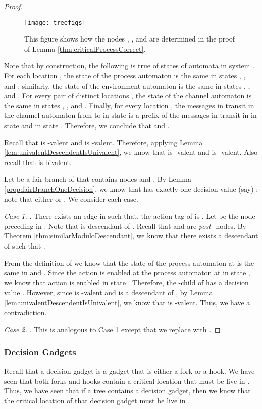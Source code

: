 \documentclass[11pt]{article}
\numberwithin{theorem}{section}
\begin{document}
\begin{proof}
\begin{figure}[hptb]
 \centering
\texttt{[image: treefigs]}
 \caption{This figure shows how the nodes , , and  are determined in the proof of Lemma \ref{thm:criticalProcessCorrect}.}
 \label{fig:extendPathsByFDEdges}
\end{figure}


Note that by construction, the following is true of states of automata in system . For each location , the state of the process automaton  is the same in states , , and ; similarly, the state of the environment automaton  is the same in states , , and . For every pair of distinct locations , the state of the channel automaton  is the same in states , , and . Finally, for every location , the messages in transit in the channel automaton  from  to  in state  is a prefix of the messages in transit in  in state  and in state . Therefore, we conclude that  and .

Recall that  is -valent and  is -valent. Therefore, applying Lemma \ref{lem:univalentDescendentIsUnivalent}, we know that  is -valent and   is -valent. Also recall that  is bivalent. 

Let  be a fair branch of  that contains nodes  and . 
By Lemma \ref{prop:fairBranchOneDecision}, we know that  has exactly one decision value (say) ; note that either  or . We consider each case.

\emph{Case 1.} . There exists an edge  in  such that, the action tag of  is . Let  be the node preceding  in . Note that  is descendant of . 
Recall that  and  are \emph{post-} nodes.
By Theorem \ref{thm:similarModuloDescendant}, we know that there exists a descendant  of  such that .

From the definition of  we know that the state of the process automaton at  is the same in  and . Since the action  is enabled at the process automaton at  in state , we know that action  is enabled in state . Therefore, the -child  of  has a decision value . However, since   is -valent and  is a descendant of , by Lemma \ref{lem:univalentDescendentIsUnivalent}, we know that  is -valent. Thus, we have a contradiction.

\emph{Case 2.} . This is analogous to Case 1 except that we replace   with .
\end{proof}

\subsubsection{Decision Gadgets}
Recall that a decision gadget is a gadget that is either a fork or a hook. We have seen that both forks and hooks contain a critical location that must be live in . 
Thus, we have seen that if a tree  contains a decision gadget, then we know that the critical location of that decision gadget must be live in . 
\end{document}
